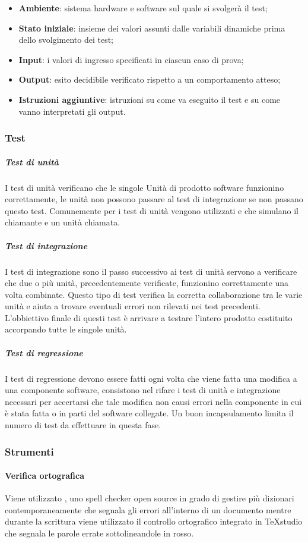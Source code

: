 			\begin{itemize}
				\item \textbf{Ambiente}: sistema hardware e software sul quale si svolgerà il test;
				\item \textbf{Stato iniziale}: insieme dei valori assunti dalle variabili dinamiche prima dello svolgimento dei test;
				\item \textbf{Input}: i valori di ingresso specificati in ciascun caso di prova;
				\item \textbf{Output}: esito decidibile verificato rispetto a un comportamento atteso;
				\item \textbf{Istruzioni aggiuntive}: istruzioni su come va eseguito il test e su come vanno interpretati gli output.
			\end{itemize}
		\subsubsection{Test}
			\subparagraph{Test di unità} \Spazio
			I test di unità verificano che le singole Unità di prodotto software funzionino correttamente, le unità non possono passare al test di integrazione se non passano questo test.
			Comunemente per i test di unità vengono utilizzati  e  che simulano il chiamante e un unità chiamata.
			\subparagraph{Test di integrazione} \Spazio
			I test di integrazione sono il passo successivo ai test di unità servono a verificare che due o più unità, precedentemente verificate, funzionino correttamente una volta combinate.
			Questo tipo di test verifica la corretta collaborazione tra le varie unità e aiuta a trovare eventuali errori non rilevati nei test precedenti.
			L'obbiettivo finale di questi test è arrivare a testare l'intero prodotto costituito accorpando tutte le singole unità.
			\subparagraph{Test di regressione}	\Spazio
			I test di regressione devono essere fatti ogni volta che viene fatta una modifica a una componente software, consistono nel rifare i test di unità e integrazione necessari per accertarsi che tale modifica non causi errori nella componente in cui è stata fatta o in parti del software collegate.
			Un buon incapsulamento limita il numero di test da effettuare in questa fase.				
	\subsubsection{Strumenti}
			\paragraph{Verifica ortografica} \Spazio
			Viene utilizzato , uno spell checker open source in grado di gestire più dizionari contemporaneamente che segnala gli errori all'interno di un documento mentre durante la scrittura viene utilizzato il controllo ortografico integrato in TeXstudio che segnala le parole errate sottolineandole in rosso.
